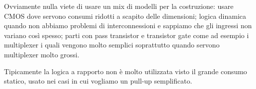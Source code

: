 Ovviamente nulla viete di usare un mix di modelli per la costruzione: usare CMOS dove servono consumi ridotti a scapito delle dimensioni; logica dinamica quando non abbiamo problemi di interconnessioni e sappiamo che gli ingressi non variano così spesso; parti con pass transistor e transistor gate come ad esempio i multiplexer i quali vengono molto semplici soprattutto quando servono multiplexer molto grossi.

Tipicamente la logica a rapporto non è molto utilizzata visto il grande consumo statico, usato nei casi in cui vogliamo un pull-up semplificato.



